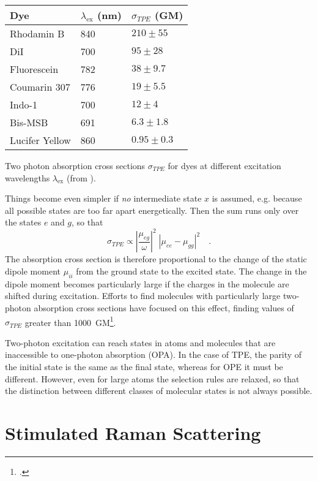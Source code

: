 \begin{margintable} \renewcommand{\arraystretch}{1.1}
\begin{tabular}{lll}
 Dye & $\lambda_{\text{ex}}$ (nm) & $\sigma_{TPE}$ (GM) \\
\hline Rhodamin B & 840    & $210 \pm 55$ \\
DiI      & 700    & $95 \pm 28$   \\
Fluorescein & 782  &  $38 \pm 9.7$ \\
Coumarin 307 & 776  &  $19 \pm 5.5$   \\
Indo-1   & 700    &  $12 \pm 4$ \\
Bis-MSB & 691    & $6.3 \pm 1.8$ \\
Lucifer Yellow & 860  &  $0.95 \pm 0.3$   \\ 
\end{tabular}
\caption{Two photon absorption cross sections $\sigma_{TPE}$ for dyes at different excitation wavelengths $\lambda_{\text{ex}}$ (from \cite{xu96mar}). } \label{tab:tpe_sigma}
\end{margintable}


Things become even simpler if \emph{no} intermediate state $x$ is assumed, e.g. because all possible states are too far apart energetically. Then the sum runs only over the states $e$ and $g$, so that
\begin{equation}
\sigma_{TPE} \propto \left| \frac{\mu_{eg}}{\omega} \right|^2 \; \left| \mu_{ee} -  \mu_{gg} \right|^2 \quad .
\end{equation}
The absorption cross section is therefore proportional to the change of the static dipole moment $\mu_{ii}$ from the ground state to the excited state. The change in the dipole moment becomes particularly large if the charges in the molecule are shifted during excitation. Efforts to find molecules with particularly large two-photon absorption cross sections have focused on this effect, finding values of $\sigma_{TPE}$ greater than 1000~GM\footcite{albota98}.

Two-photon excitation can reach states in atoms and molecules that are inaccessible to one-photon absorption (OPA). In the case of TPE, the parity of the initial state is the same as the final state, whereas for OPE it must be different.  However, even for large atoms the selection rules are relaxed, so that the distinction between different classes of molecular states is not always possible. 
 




\section{Stimulated Raman Scattering}


